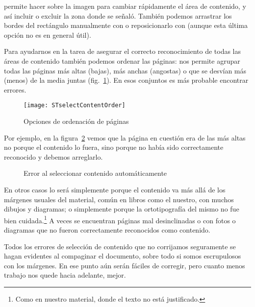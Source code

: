 \documentclass[%
	a5paper,
	10pt,
	twoside,
	openright,
	final,
]{memoir}
\begin{document}
{	\scantailorAdvanced permite hacer \menu{\leftclick\,\leftclick} sobre la imagen para cambiar rápidamente el área de contenido, y así incluir o excluir la zona donde se señaló. También podemos arrastrar los bordes del rectángulo manualmente con  o reposicionarlo con  (aunque esta última opción no es en general útil).

	Para ayudarnos en la tarea de asegurar el correcto reconocimiento de todas las áreas de contenido también podemos ordenar las páginas:  nos permite agrupar todas las páginas más altas (bajas), más anchas (angostas) o que se desvían más (menos) de la media juntas (fig.~\ref{fig:STselectContentOrder}). En esos conjuntos es más probable encontrar errores.

	\begin{figure}
		\centering
		\texttt{[image: STselectContentOrder]}
		\caption{Opciones de ordenación de páginas\label{fig:STselectContentOrder}}
	\end{figure}

	Por ejemplo, en la figura~\ref{fig:STselectContentError} vemos que la página en cuestión era de las más altas no porque el contenido lo fuera, sino porque no había sido correctamente reconocido y debemos arreglarlo.

	\begin{figure}
		\centering
		\caption{Error al seleccionar contenido automáticamente\label{fig:STselectContentError}}
	\end{figure}

	En otros casos lo será simplemente porque el contenido va más allá de los márgenes usuales del material, común en libros como el nuestro, con muchos dibujos y diagramas; o simplemente porque la ortotipografía del mismo no fue bien cuidada.\footnote{Como en nuestro material, donde el texto no está justificado.} A veces se encuentran páginas mal desinclinadas o con fotos o diagramas que no fueron correctamente reconocidos como contenido.

	Todos los errores de selección de contenido que no corrijamos seguramente se hagan evidentes al compaginar el documento, sobre todo si somos escrupulosos con los márgenes. En ese punto aún serán fáciles de corregir, pero cuanto menos trabajo nos quede hacia adelante, mejor.

}
\end{document}
